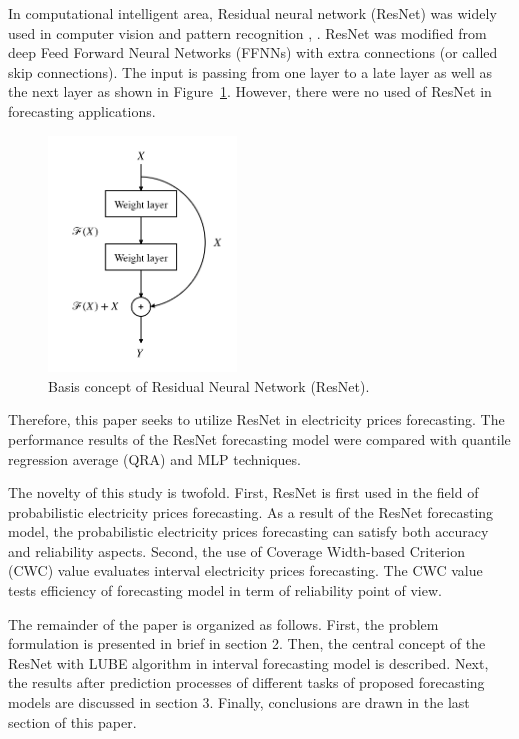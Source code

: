 \documentclass[review]{elsarticle}
\begin{document}
    In computational intelligent area, Residual neural network (ResNet) was widely used in computer vision and pattern recognition \cite{DBLP:journals/corr/HeZRS15}, \cite{DBLP:journals/corr/ZagoruykoK16}.
    ResNet was modified from deep Feed Forward Neural Networks (FFNNs) with extra connections (or called skip connections). The input is passing from one layer to a late layer as well as the next layer as shown in Figure~\ref{Fig:Basic_DRNN}.
    However, there were no used of ResNet in forecasting applications.

    \begin{figure}[H]
      \centering
      \includegraphics[width=5cm]{basic_DRNN}
      \caption{Basis concept of Residual Neural Network (ResNet).}
      \label{Fig:Basic_DRNN}
    \end{figure}

    Therefore, this paper seeks to utilize ResNet in electricity prices forecasting.
    The performance results of the ResNet forecasting model were compared with quantile regression average (QRA) and MLP techniques.

    The novelty of this study is twofold.
    First, ResNet is first used in the field of probabilistic electricity prices forecasting. As a result of the ResNet forecasting model, the probabilistic electricity prices forecasting can satisfy both accuracy and reliability aspects.
    Second, the use of Coverage Width-based Criterion (CWC) value evaluates interval electricity prices forecasting. The CWC value tests efficiency of forecasting model in term of reliability point of view.

    The remainder of the paper is organized as follows.
    First, the problem formulation is presented in brief in section 2.
    Then, the central concept of the ResNet with LUBE algorithm in interval forecasting model is described.
    Next, the results after prediction processes of different tasks of proposed forecasting models are discussed in section 3.
    Finally, conclusions are drawn in the last section of this paper.
\end{document}
